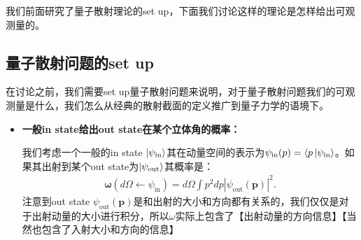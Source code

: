 我们前面研究了量子散射理论的set up，下面我们讨论这样的理论是怎样给出可观测量的。

\subsection{量子散射问题的set up}

在讨论之前，我们需要set up量子散射问题来说明，对于量子散射问题我们的可观测量是什么，我们怎么从经典的散射截面的定义推广到量子力学的语境下。

\bigskip
{}

\begin{itemize}
  \item \textbf{一般in state给出out state在某个立体角的概率：}

    我们考虑一个一般的in state $ \ket{\psi_{\text{in}}} $其在动量空间的表示为$ \psi_{\text{in}}(p) =
    \langle p \ket{\psi_{\text{in}}} $。如果其出射到某个out state为$ \ket{\psi_{\text{out}}} $其概率是：
    \begin{align}
      \boldsymbol{\omega}\left(d\Omega\leftarrow\psi_{\mathrm{in}}\right)=d\Omega\int
      p^2dp\left|\psi_{\mathrm{out}}(\mathbf{p})\right|^2.
    \end{align}
    注意到out state $ \psi_{\text{out}}(\mathbf{p})
    $是和出射的大小和方向都有关系的，我们仅仅是对于出射动量的大小进行积分，所以$ \omega
    $实际上包含了【出射动量的方向信息】【当然也包含了入射大小和方向的信息】

\end{itemize}

\bigskip
{}

